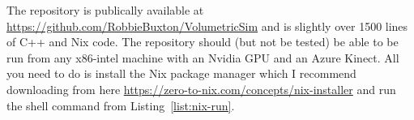 \begin{invisBox}
    \hfill
\end{invisBox}

The repository is publically available at \url{https://github.com/RobbieBuxton/VolumetricSim} and is slightly over 1500 lines of C++ and Nix code. The repository should (but not be tested) be able to be run from any x86-intel machine with an Nvidia GPU and an Azure Kinect. All you need to do is install the Nix package manager which I recommend downloading from here \url{https://zero-to-nix.com/concepts/nix-installer} and run the shell command from Listing~\ref{list:nix-run}.

